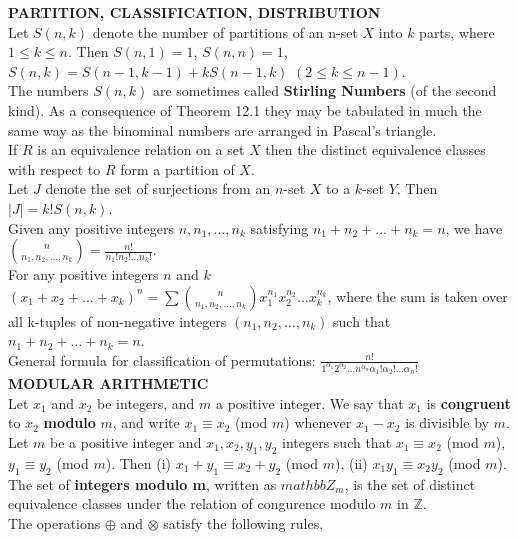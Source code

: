 \documentclass[10pt,landscape]{article}
\begin{document}
\begin{multicols}{4}
\textbf{PARTITION, CLASSIFICATION, DISTRIBUTION}\\
Let $S(n,k)$ denote the number of partitions of an n-set $X$ into $k$
parts, where $1 \leq k \leq n$. Then $S(n,1) = 1$, $S(n,n) = 1$,
$S(n,k) = S(n-1, k-1) + kS(n-1,k)$ $(2 \leq k \leq n-1)$.\\
The numbers $S(n,k)$ are sometimes called \textbf{Stirling Numbers}
(of the second kind). As a consequence of Theorem 12.1 they may be
tabulated in much the same way as the binominal numbers are arranged
in Pascal's triangle.\\
If $R$ is an equivalence relation on a set $X$ then the distinct
equivalence classes with respect to $R$ form a partition of $X$.\\
Let $J$ denote the set of surjections from an $n$-set $X$ to a $k$-set
$Y$. Then $|J| = k!S(n,k)$.\\
Given any positive integers $n, n_{1}, \dots ,n_{k}$ satisfying
$n_{1} + n_{2} + \dots + n_{k} = n$, we have
$\binom{n}{n_{1},n_{2},\dots,n_{k}}=\frac{n!}{n_{1}!n_{2}!\dots
  n_{k}!}$.\\
For any positive integers $n$ and $k$ $(x_{1}+ x_{2} + \dots
+ x_{k})^{n} = \sum \binom{n}{n_{1},n_{2}, \dots
  ,n_{k}} x_{1}^{n_{1}} x_{2}^{n_{2}} \dots x_{k}^{n_{k}}$, where the sum
    is taken over all k-tuples of non-negative integers $(n_{1},
    n_{2}, \dots, n_{k})$ such that $n_{1}+n_{2}+ \dots + n_{k} =
    n$.\\
General formula for classification of permutations:
$\frac{n!}{1^{\alpha_{1}}2^{\alpha_{2}}\dots
  n^{\alpha_{n}}\alpha_{1}!\alpha_{2}!\dots \alpha_{n}!}$\\
\textbf{MODULAR ARITHMETIC}\\
Let $x_{1}$ and $x_{2}$ be integers, and $m$ a positive integer. We
say that $x_{1}$ is \textbf{congruent} to $x_{2}$ \textbf{modulo} $m$,
and write $x_{1} \equiv x_{2}$ (mod $m$) whenever $x_{1} - x_{2}$ is
divisible by $m$.\\
Let $m$ be a positive integer and $x_{1}, x_{2}, y_{1}, y_{2}$
integers such that $x_{1} \equiv x_{2}$ (mod $m$), $y_{1} \equiv y_{2}$
(mod $m$). Then (i) $x_{1} + y_{1} \equiv x_{2} + y_{2}$ (mod $m$), (ii)
$x_{1}y_{1} \equiv x_{2}y_{2}$ (mod $m$).\\
The set of \textbf{integers modulo m}, written as $mathbb{Z}_{m}$, is
the set of distinct equivalence classes under the relation of
congurence modulo $m$ in $\mathbb{Z}$.\\
The operations $\oplus$ and $\otimes$ satisfy the following rules,

\end{multicols}
\end{document}
